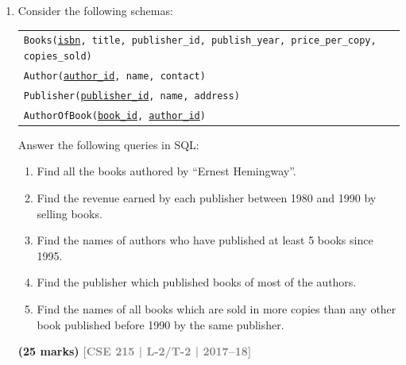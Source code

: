 \documentclass[12pt]{article}
\newcommand{\yr}[1]{\hfill\textcolor{gray}{\small\textbf{[#1]}}}
\newcommand{\mk}[1]{\textcolor{orange!70!black}{\small\textbf{(#1 marks)}}}
\begin{document}
\begin{enumerate}
\begin{center}
\end{center}



\mk{10} \yr{CSE 215 | L-2/T-2 | 2018--19}


\item Consider the following schemas:
\begin{center}
\begin{tabular}{l}
\texttt{Books(\underline{isbn}, title, publisher\_id, publish\_year, price\_per\_copy, copies\_sold)}\\
\texttt{Author(\underline{author\_id}, name, contact)}\\
\texttt{Publisher(\underline{publisher\_id}, name, address)}\\
\texttt{AuthorOfBook(\underline{book\_id}, \underline{author\_id})}
\end{tabular}
\end{center}
Answer the following queries in SQL:
\begin{enumerate}
  \item Find all the books authored by ``Ernest Hemingway''.
  \item Find the revenue earned by each publisher between 1980 and 1990 by selling books.
  \item Find the names of authors who have published at least 5 books since 1995.
  \item Find the publisher which published books of most of the authors.
  \item Find the names of all books which are sold in more copies than any other book published before 1990 by the same publisher.
\end{enumerate}
\mk{25} \yr{CSE 215 | L-2/T-2 | 2017--18}



\end{enumerate}
\end{document}
